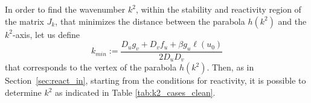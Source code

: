 \documentclass{article}
\newcommand{\jac}{J_{k}}
\begin{document}
{In order to} find the wavenumber $k^2$, within the stability and reactivity region of the matrix $\jac$, that minimizes the distance between the parabola $h(k^2)$ and the $k^2$-axis, let us define
\begin{equation}
    k_{min} :=  \frac{D_u g_v + D_v f_u + \beta g_u \ell(u_0)}{2 D_u D_v}
\end{equation}
that corresponds to the vertex of the parabola $h(k^2)$. Then, as in Section~\ref{sec:react_in}, starting from the conditions for reactivity, it is possible to determine $k^2$ as indicated in Table \ref{tab:k2_cases_clean}.
\end{document}

